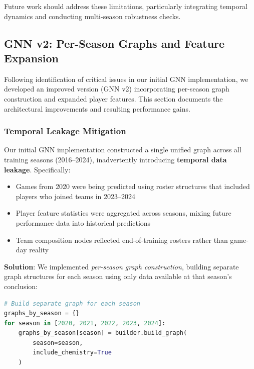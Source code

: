 Future work should address these limitations, particularly integrating temporal dynamics and conducting multi-season robustness checks.

\subsection{GNN v2: Per-Season Graphs and Feature Expansion}
\label{subsec:gnn_v2_improvements}

Following identification of critical issues in our initial GNN implementation, we developed an improved version (GNN v2) incorporating per-season graph construction and expanded player features. This section documents the architectural improvements and resulting performance gains.

\subsubsection{Temporal Leakage Mitigation}
\label{subsubsec:gnn_temporal_leakage}

Our initial GNN implementation constructed a single unified graph across all training seasons (2016--2024), inadvertently introducing \textbf{temporal data leakage}. Specifically:

\begin{itemize}[noitemsep]
    \item Games from 2020 were being predicted using roster structures that included players who joined teams in 2023--2024
    \item Player feature statistics were aggregated across seasons, mixing future performance data into historical predictions
    \item Team composition nodes reflected end-of-training rosters rather than game-day reality
\end{itemize}

\textbf{Solution}: We implemented \textit{per-season graph construction}, building separate graph structures for each season using only data available at that season's conclusion:

\begin{lstlisting}[language=Python, caption={Per-Season Graph Construction}, label={lst:per_season_graph}]
# Build separate graph for each season
graphs_by_season = {}
for season in [2020, 2021, 2022, 2023, 2024]:
    graphs_by_season[season] = builder.build_graph(
        season=season,
        include_chemistry=True
    )
\end{lstlisting}

